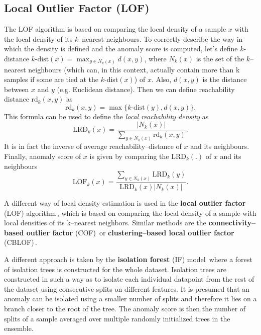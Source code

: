 \subsection{Local Outlier Factor (LOF)}
The LOF algorithm \cite{breunig2000lof} is based on comparing the local density of a sample $x$ with the local density of its $k$--nearest neighbours. To correctly describe the way in which the density is defined and the anomaly score is computed, let's define $k$-distance $k\text{-dist}(x)=\max_{y \in N_k(x)} d(x,y)$, where $N_k(x)$ is the set of the $k$--nearest neighbours (which can, in this context, actually contain more than k samples if some are tied at the $k$-dist$(x)$) of $x$. Also, $d(x,y)$ is the distance between $x$ and $y$ (e.g. Euclidean distance). Then we can define reachability distance $\text{rd}_k(x,y)$ as $$\text{rd}_k(x,y)=\max \lbrace k\text{-dist}(y), d(x,y) \rbrace.$$ This formula can be used to define the \textit{local reachability density} as 
\begin{equation}
  \text{LRD}_k(x)=\frac{|N_k(x)|}{\sum_{y\in N_k(x)}\text{rd}_k(x,y)}.
\end{equation}
It is in fact the inverse of average reachability--distance of $x$ and its neighbours. Finally, anomaly score of $x$ is given by comparing the $\text{LRD}_k(.)$ of $x$ and its neighbours 
\begin{equation}
  \text{LOF}_k(x)=\frac{\sum_{y\in N_k(x)} \text{LRD}_k(y)}{\text{LRD}_k(x) |N_k(x)|}.
\end{equation}




A different way of local density estimation is used in the \textbf{local
outlier factor} (LOF) algorithm\,\cite{breunig2000lof}, which is
based on comparing the local density of a sample with local densities
of its k--nearest neighbors. Similar methods are the \textbf{connectivity--based
outlier factor} (COF)\,\cite{tang2002enhancing} or \textbf{clustering--based
local outlier factor} (CBLOF)\,\cite{he2003discovering}.

A different approach is taken by the \textbf{isolation forest }(IF)
model\,\cite{liu2008isolation} where a forest of isolation trees
is constructed for the whole dataset. Isolation trees are constructed
in such a way as to isolate each individual datapoint from the rest
of the dataset using consecutive splits on different features. It
is presumed that an anomaly can be isolated using a smaller number
of splits and therefore it lies on a branch closer to the root of
the tree. The anomaly score is then the number of splits of a sample
averaged over multiple randomly initialized trees in the ensemble.

